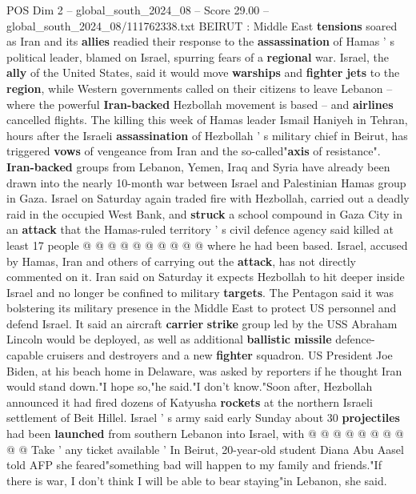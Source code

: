 \begin{textsample}{POS Dim 2 – global\_south\_2024\_08 – Score 29.00 – global\_south\_2024\_08/111762338.txt}  \label{ex:f2_pos_015}
BEIRUT : Middle East \textbf{tensions} soared as Iran and its \textbf{allies} readied their response to the \textbf{assassination} of Hamas ' s political leader, blamed on Israel, spurring fears of a \textbf{regional} war.
Israel, the \textbf{ally} of the United States, said it would move \textbf{warships} and \textbf{fighter} \textbf{jets} to the \textbf{region}, while Western governments called on their citizens to leave Lebanon -- where the powerful \textbf{Iran-backed} Hezbollah movement is based -- and \textbf{airlines} cancelled flights.
The killing this week of Hamas leader Ismail Haniyeh in Tehran, hours after the Israeli \textbf{assassination} of Hezbollah ' s military chief in Beirut, has triggered \textbf{vows} of vengeance from Iran and the so-called"\textbf{axis} of resistance". \textbf{Iran-backed} groups from Lebanon, Yemen, Iraq and Syria have already been drawn into the nearly 10-month war between Israel and Palestinian Hamas group in Gaza.
Israel on Saturday again traded fire with Hezbollah, carried out a deadly raid in the occupied West Bank, and \textbf{struck} a school compound in Gaza City in an \textbf{attack} that the Hamas-ruled territory ' s civil defence agency said killed at least 17 people @ @ @ @ @ @ @ @ @ @ where he had been based.
Israel, accused by Hamas, Iran and others of carrying out the \textbf{attack}, has not directly commented on it.
Iran said on Saturday it expects Hezbollah to hit deeper inside Israel and no longer be confined to military \textbf{targets}.
The Pentagon said it was bolstering its military presence in the Middle East to protect US personnel and defend Israel.
It said an aircraft \textbf{carrier} \textbf{strike} group led by the USS Abraham Lincoln would be deployed, as well as additional \textbf{ballistic} \textbf{missile} defence-capable cruisers and destroyers and a new \textbf{fighter} squadron.
US President Joe Biden, at his beach home in Delaware, was asked by reporters if he thought Iran would stand down."I hope so,"he said."I don't know."Soon after, Hezbollah announced it had fired dozens of Katyusha \textbf{rockets} at the northern Israeli settlement of Beit Hillel.
Israel ' s army said early Sunday about 30 \textbf{projectiles} had been \textbf{launched} from southern Lebanon into Israel, with @ @ @ @ @ @ @ @ @ @ Take ' any ticket available ' In Beirut, 20-year-old student Diana Abu Aasel told AFP she feared"something bad will happen to my family and friends."If there is war, I don't think I will be able to bear staying"in Lebanon, she said.

\end{textsample}
